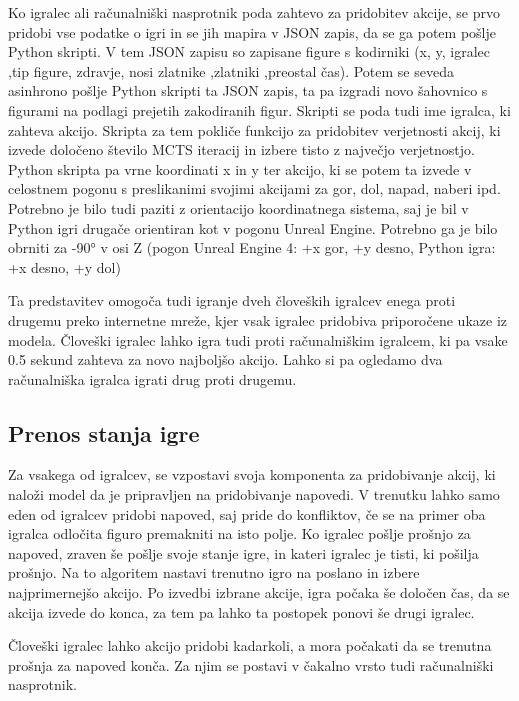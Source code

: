 \documentclass[a4paper, 12pt]{book}
\begin{document}
Ko igralec ali računalniški nasprotnik poda zahtevo za pridobitev akcije, se prvo pridobi vse podatke o igri in se jih mapira v JSON zapis, da se ga potem pošlje Python skripti.
V tem JSON zapisu so zapisane figure s kodirniki (x, y, igralec ,tip figure, zdravje, nosi zlatnike ,zlatniki ,preostal čas).
Potem se seveda asinhrono pošlje Python skripti ta JSON zapis, ta pa izgradi novo šahovnico s figurami na podlagi prejetih zakodiranih figur.
Skripti se poda tudi ime igralca, ki zahteva akcijo.
Skripta za tem pokliče funkcijo za pridobitev verjetnosti akcij, ki izvede določeno število MCTS iteracij in izbere tisto z največjo verjetnostjo.
Python skripta pa vrne koordinati x in y ter akcijo, ki se potem ta izvede v celostnem pogonu s preslikanimi svojimi akcijami za gor, dol, napad, naberi ipd.
Potrebno je bilo tudi paziti z orientacijo koordinatnega sistema, saj je bil v Python igri drugače orientiran kot v pogonu Unreal Engine. 
Potrebno ga je bilo obrniti za -90° v osi Z (pogon Unreal Engine 4: +x gor, +y desno, Python igra: +x desno, +y dol)

Ta predstavitev omogoča tudi igranje dveh človeških igralcev enega proti drugemu preko internetne mreže, kjer vsak igralec pridobiva priporočene ukaze iz modela.
Človeški igralec lahko igra tudi proti računalniškim igralcem, ki pa vsake 0.5 sekund zahteva za novo najboljšo akcijo.
Lahko si pa ogledamo dva računalniška igralca igrati drug proti drugemu.

\subsection{Prenos stanja igre}
Za vsakega od igralcev, se vzpostavi svoja komponenta za pridobivanje akcij, ki naloži model da je pripravljen na pridobivanje napovedi.
V trenutku lahko samo eden od igralcev pridobi napoved, saj pride do konfliktov, če se na primer oba igralca odločita figuro premakniti na isto polje.
Ko igralec pošlje prošnjo za napoved, zraven še pošlje svoje stanje igre, in kateri igralec je tisti, ki pošilja prošnjo.
Na to algoritem nastavi trenutno igro na poslano in izbere najprimernejšo akcijo.
Po izvedbi izbrane akcije, igra počaka še določen čas, da se akcija izvede do konca, za tem pa lahko ta postopek ponovi še drugi igralec.

Človeški igralec lahko akcijo pridobi kadarkoli, a mora počakati da se trenutna prošnja za napoved konča. Za njim se postavi v čakalno vrsto tudi računalniški nasprotnik.
\end{document}
